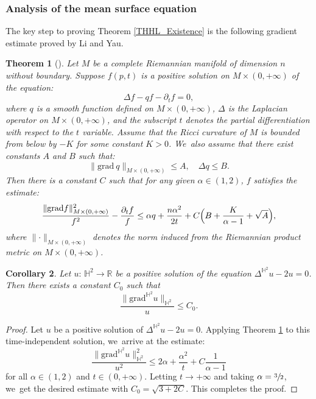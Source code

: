\documentclass[10pt]{amsart}
\theoremstyle{plain}
\newtheorem{cor}{Corollary}[section]
\newtheorem{theorem}[cor]{Theorem}
\theoremstyle{definition}
\newcommand{\grad}{\mathrm{grad}^{\mathbb{H}^2}}
\begin{document}
\subsubsection{Analysis of the mean surface equation}
The key step to proving Theorem \ref{THHL_Existence} is the following gradient estimate proved by Li and Yau.

\begin{theorem}[{\cite[Th.\,1.3]{Li_Yau}}]\label{Li_Yau}
Let $M$ be a complete Riemannian manifold of dimension $n$ without boundary. Suppose $f(p, t)$ is a positive solution on $M \times (0, +\infty)$ of the equation:
\[
\Delta f-qf-\partial_tf=0,
\]
where $q$ is a smooth function defined on $M \times (0, +\infty)$, $\Delta$ is the Laplacian operator on $M \times (0, +\infty)$, and the subscript $t$ denotes the partial differentiation with respect to the $t$ variable. Assume that the Ricci curvature of $M$ is bounded from below by $-K$ for some constant $K > 0$. We~also assume that there exist constants $A$ and $B$ such that:
\[
\lVert \mathrm{grad}\ q\rVert_{M\times(0,+\infty)}\leq A,\quad \Delta q\leq B.
\]
Then there is a constant $C$ such that for any given $\alpha \in (1, 2)$, $f$ satisfies the estimate:
\[
\frac{\lVert \mathrm{grad} f\rVert_{M\times(0,+\infty)}^2}{f^2}-\frac{\partial_tf}{f}\leq \alpha q+\frac{n\alpha^2}{2t}+C\Bigl(B+\frac{K}{\alpha-1}+\sqrt{A}\Bigr),
\]
where $\lVert\cdot\rVert_{M \times (0, +\infty)}$ denotes the norm induced from the Riemannian product metric on $M \times (0, +\infty)$.
\end{theorem}
\begin{cor}\label{Li_Yau_Cor}
Let $u{:}\, \mathbb{H}^2 \!\to\! \mathbb{R}$ be a positive solution of the equation \hbox{$\Delta^{\mathbb{H}^2} u \!-\! 2u \!=\! 0$}. Then there exists a constant $C_0$ such that
\[
\frac{\lVert \grad u\rVert_{\mathbb{H}^2}}{u} \leq C_0.
\]
\end{cor}

\begin{proof}
Let $u$ be a positive solution of $\Delta^{\mathbb{H}^2} u - 2u = 0$. Applying Theorem \ref{Li_Yau} to this time-independent solution, we~arrive at the estimate:
\[
\frac{\lVert \grad u\rVert_{\mathbb{H}^2}^2}{u^2} \leq 2\alpha + \frac{\alpha^2}{t} + C\frac{1}{\alpha-1}
\]
for all $\alpha \in (1,2)$ and $t \in (0, +\infty)$. Letting $t \to +\infty$ and taking $\alpha = \sfrac{3}{2}$, we~get the desired estimate with $C_0 = \sqrt{3 + 2C}$. This completes the proof.
\end{proof}
\end{document}
